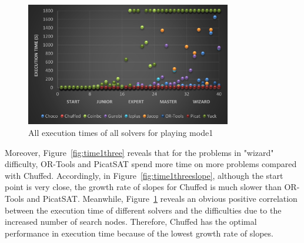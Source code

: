 \begin{figure}[htbp]
\centering
\includegraphics[width=0.8\textwidth]{figs/time1all.png}
\caption{All execution times of all solvers for playing mode1}
\label{fig:mode1time1}
\end{figure}
Moreover, Figure~\ref{fig:time1three} reveals that for the problems in "wizard" difficulty, OR-Tools and PicatSAT spend more time on more problems compared with Chuffed. Accordingly, in Figure~\ref{fig:time1threeslope}, although the start point is very close, the growth rate of slopes for Chuffed is much slower than OR-Tools and PicatSAT. Meanwhile, Figure~\ref{fig:mode1time1} reveals an obvious positive correlation between the execution time of different solvers and the difficulties due to the increased number of search nodes. Therefore, Chuffed has the optimal performance in execution time because of the lowest growth rate of slopes. 
